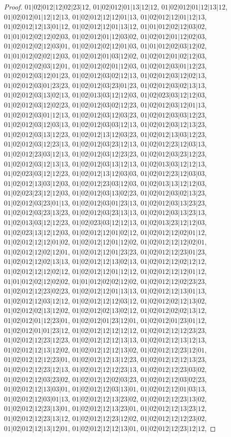 \documentclass[12pt]{article}
\theoremstyle{plain}
\theoremstyle{definition}
\theoremstyle{remark}
\begin{document}
\begin{proof}
$01|02|012|12|02|23|12$, $01|02|012|01|13|12|12$, $01|02|012|01|12|13|12$, $01|02|012|01|12|12|13$, $01|02|012|12|12|01|13$, $01|02|012|12|01|12|13$, $01|02|012|12|13|01|12$, $01|02|012|12|01|13|12$, $01|01|012|02|12|03|02$, $01|01|012|02|12|02|03$, $01|02|012|01|12|03|02$, $01|02|012|01|12|02|03$, $01|02|012|02|12|03|01$, $01|02|012|02|12|01|03$, $01|01|012|02|03|12|02$, $01|01|012|02|02|12|03$, $01|02|012|01|03|12|02$, $01|02|012|01|02|12|03$, $01|02|012|02|03|12|01$, $01|02|012|02|01|12|03$, $01|02|012|03|01|12|23$, $01|02|012|03|12|01|23$, $01|02|012|03|02|12|13$, $01|02|012|03|12|02|13$, $01|02|012|03|01|23|23$, $01|02|012|03|23|01|23$, $01|02|012|03|02|13|13$, $01|02|012|03|13|02|13$, $01|02|013|03|12|12|03$, $01|02|023|03|12|12|03$, $01|02|012|03|12|02|23$, $01|02|012|03|02|12|23$, $01|02|012|03|12|01|13$, $01|02|012|03|01|12|13$, $01|02|012|03|12|03|23$, $01|02|012|03|03|12|23$, $01|02|012|03|12|03|13$, $01|02|012|03|03|12|13$, $01|02|012|03|12|13|23$, $01|02|012|03|13|12|23$, $01|02|012|13|12|03|23$, $01|02|012|13|03|12|23$, $01|02|012|03|12|23|13$, $01|02|012|03|23|12|13$, $01|02|012|23|12|03|13$, $01|02|012|23|03|12|13$, $01|02|012|03|12|23|23$, $01|02|012|03|23|12|23$, $01|02|012|03|12|13|13$, $01|02|012|03|13|12|13$, $01|02|013|03|12|12|13$, $01|02|023|03|12|12|23$, $01|02|012|13|12|03|03$, $01|02|012|23|12|03|03$, $01|02|012|13|03|12|03$, $01|02|012|23|03|12|03$, $01|02|013|13|12|12|03$, $01|02|023|23|12|12|03$, $01|02|012|03|13|02|23$, $01|02|012|03|02|13|23$, $01|02|012|03|23|01|13$, $01|02|012|03|01|23|13$, $01|02|012|03|13|23|23$, $01|02|012|03|23|13|23$, $01|02|012|03|23|13|13$, $01|02|012|03|13|23|13$, $01|02|013|03|12|12|23$, $01|02|023|03|12|12|13$, $01|02|013|23|12|12|03$, $01|02|023|13|12|12|03$, $01|02|012|12|01|02|12$, $01|02|012|12|02|01|12$, $01|02|012|12|12|01|02$, $01|02|012|12|01|12|02$, $01|02|012|12|12|02|01$, $01|02|012|12|02|12|01$, $01|02|012|12|01|23|23$, $01|02|012|12|23|01|23$, $01|02|012|12|02|13|13$, $01|02|012|12|13|02|13$, $01|02|012|12|02|12|12$, $01|02|012|12|12|02|12$, $01|02|012|12|01|12|12$, $01|02|012|12|12|01|12$, $01|01|012|02|12|02|02$, $01|01|012|02|02|12|02$, $01|02|012|12|02|23|23$, $01|02|012|12|23|02|23$, $01|02|012|12|01|13|13$, $01|02|012|12|13|01|13$, $01|02|012|12|03|12|12$, $01|02|012|12|12|03|12$, $01|02|012|02|12|13|02$, $01|02|012|02|13|12|02$, $01|02|012|02|13|02|12$, $01|02|012|02|02|13|12$, $01|02|012|01|12|23|01$, $01|02|012|01|23|12|01$, $01|02|012|01|23|01|12$, $01|02|012|01|01|23|12$, $01|02|012|12|12|12|12$, $01|02|012|12|12|23|23$, $01|02|012|12|23|12|23$, $01|02|012|12|12|13|13$, $01|02|012|12|13|12|13$, $01|02|012|12|13|12|02$, $01|02|012|12|12|13|02$, $01|02|012|12|23|12|01$, $01|02|012|12|12|23|01$, $01|02|012|12|13|12|23$, $01|02|012|12|12|13|23$, $01|02|012|12|23|12|13$, $01|02|012|12|12|23|13$, $01|02|012|12|23|03|02$, $01|02|012|12|03|23|02$, $01|02|012|12|02|03|23$, $01|02|012|12|03|02|23$, $01|02|012|12|13|03|01$, $01|02|012|12|03|13|01$, $01|02|012|12|01|03|13$, $01|02|012|12|03|01|13$, $01|02|012|12|13|23|02$, $01|02|012|12|23|13|02$, $01|02|012|12|23|13|01$, $01|02|012|12|13|23|01$, $01|02|012|12|13|23|12$, $01|02|012|12|23|13|12$, $01|02|012|12|23|12|02$, $01|02|012|12|12|23|02$, $01|02|012|12|13|12|01$, $01|02|012|12|12|13|01$, $01|02|012|12|23|12|12$, 
\end{proof}
\end{document}
